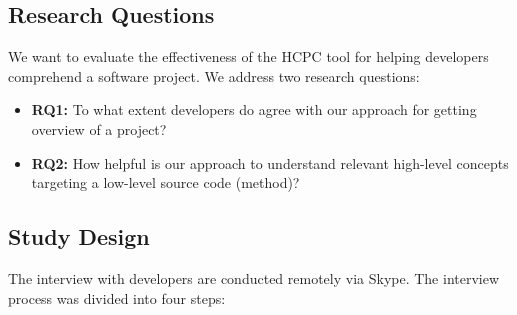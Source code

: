 \subsection{Research Questions}
\label{hla3:evaluation}
We want to evaluate the effectiveness of the HCPC tool for helping developers comprehend a software project. We address two research questions:
\begin{itemize}
    \item \textbf{RQ1:} To what extent developers do agree with our approach for getting overview of a project?
    \item \textbf{RQ2:} How helpful is our approach to understand relevant high-level concepts targeting a low-level source code (method)?
\end{itemize}
\subsection{Study Design}
The interview with developers are conducted remotely via Skype. The interview process was divided into four steps:
